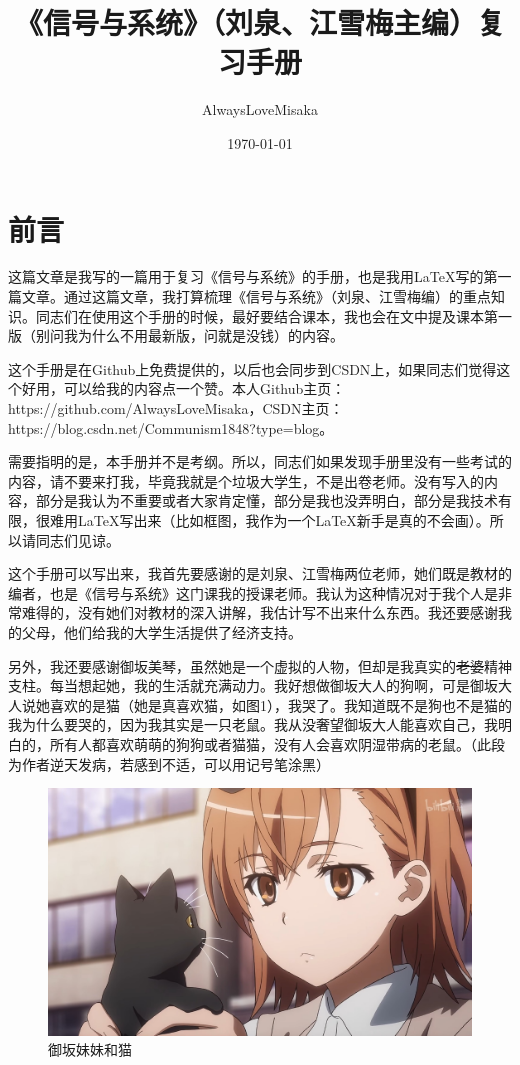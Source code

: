 \documentclass[UTF8,a4paper,11pt]{article}
\title{\huge\heiti《信号与系统》（刘泉、江雪梅主编）复习手册}
\author{AlwaysLoveMisaka}
\date{\today}
\begin{document}
\maketitle
\thispagestyle{empty}
\clearpage

\tableofcontents
\thispagestyle{empty}
\clearpage

\setcounter{page}{1}
\section{前言}
这篇文章是我写的一篇用于复习《信号与系统》的手册，也是我用\LaTeX 写的第一篇文章。通过这篇文章，我打算梳理《信号与系统》（刘泉、江雪梅编）的重点知识。同志们在使用这个手册的时候，最好要结合课本，我也会在文中提及课本第一版（别问我为什么不用最新版，问就是没钱）的内容。

这个手册是在Github上免费提供的，以后也会同步到CSDN上，如果同志们觉得这个好用，可以给我的内容点一个赞。本人Github主页：https://github.com/AlwaysLoveMisaka，CSDN主页：https://blog.csdn.net/Communism1848?type=blog。

需要指明的是，本手册并不是考纲。所以，同志们如果发现手册里没有一些考试的内容，请不要来打我，毕竟我就是个垃圾大学生，不是出卷老师。没有写入的内容，部分是我认为不重要或者大家肯定懂，部分是我也没弄明白，部分是我技术有限，很难用\LaTeX 写出来（比如框图，我作为一个\LaTeX 新手是真的不会画）。所以请同志们见谅。

这个手册可以写出来，我首先要感谢的是刘泉、江雪梅两位老师，她们既是教材的编者，也是《信号与系统》这门课我的授课老师。我认为这种情况对于我个人是非常难得的，没有她们对教材的深入讲解，我估计写不出来什么东西。我还要感谢我的父母，他们给我的大学生活提供了经济支持。

另外，我还要感谢御坂美琴，虽然她是一个虚拟的人物，但却是我真实的\sout{老婆}精神支柱。每当想起她，我的生活就充满动力。我好想做御坂大人的狗啊，可是御坂大人说她喜欢的是猫（她是真喜欢猫，如图1），我哭了。我知道既不是狗也不是猫的我为什么要哭的，因为我其实是一只老鼠。我从没奢望御坂大人能喜欢自己，我明白的，所有人都喜欢萌萌的狗狗或者猫猫，没有人会喜欢阴湿带病的老鼠。（此段为作者逆天发病，若感到不适，可以用记号笔涂黑）
\newline
\begin{figure}[htbp]
\centering
\includegraphics[scale=0.2]{cat.jpg}
\caption{御坂妹妹和猫}
\label{figure}
\end{figure}
\end{document}

